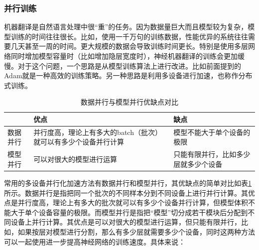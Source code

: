 \subsubsection{并行训练}

\parinterval 机器翻译是自然语言处理中很``重''的任务。因为数据量巨大而且模型较为复杂，模型训练的时间往往很长。比如，使用一千万句的训练数据，性能优异的系统往往需要几天甚至一周的时间。更大规模的数据会导致训练时间更长。特别是使用多层网络同时增加模型容量时（比如增加隐层宽度时），神经机器翻译的训练会更加缓慢。对于这个问题，一个思路是从模型训练算法上进行改进。比如前面提到的Adam就是一种高效的训练策略。另一种思路是利用多设备进行加速，也称作分布式训练。

\vspace{0.5em}
\begin{table}[htp]
\centering
\caption{ 数据并行与模型并行优缺点对比}
\label{tab:6-9}
\begin{tabular}{l | p{12em}  p{12em} }
	 		 &优点		&缺点 \\ \hline
\rule{0pt}{13pt}	数据并行 &并行度高，理论上有多大的batch（批次）就可以有多少个设备并行计算	&模型不能大于单个设备的极限 \\
\rule{0pt}{13pt}	模型并行	&可以对很大的模型进行运算	&只能有限并行，比如多少层就多少个设备 \\
\end{tabular}
\end{table}

\parinterval 常用的多设备并行化加速方法有数据并行和模型并行，其优缺点的简单对比如表\ref{tab:6-9}所示。数据并行是指把同一个批次的不同样本分到不同设备上进行并行计算。其优点是并行度高，理论上有多大的批次就可以有多少个设备并行计算，但模型体积不能大于单个设备容量的极限。而模型并行是指把``模型''切分成若干模块后分配到不同设备上并行计算。其优点是可以对很大的模型进行运算，但只能有限并行，比如，如果按层对模型进行分割，那么有多少层就需要多少个设备，同时这两种方法可以一起使用进一步提高神经网络的训练速度。具体来说：

